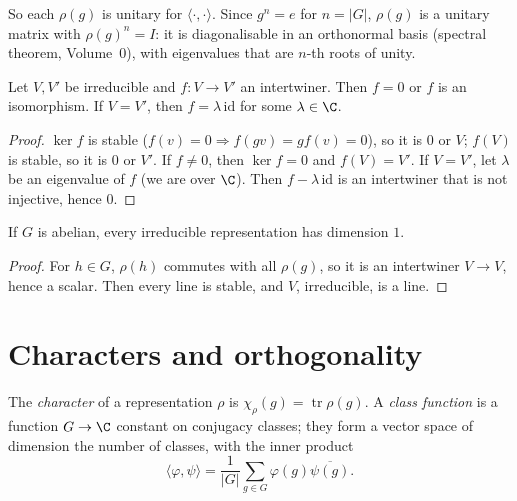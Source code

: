 So each $\rho(g)$ is unitary for $\langle\cdot,\cdot\rangle$. Since $g^n=e$ for $n=|G|$, $\rho(g)$ is a unitary matrix with $\rho(g)^n=I$: it is diagonalisable in an orthonormal basis (spectral theorem, Volume~0), with eigenvalues that are $n$-th roots of unity.

\begin{lemma}[Schur]\label{lem:schur}
Let $V,V'$ be irreducible and $f:V\to V'$ an intertwiner. Then $f=0$ or $f$ is an isomorphism. If $V=V'$, then $f=\lambda\,\mathrm{id}$ for some $\lambda\in\C$.
\end{lemma}
\begin{proof}
$\ker f$ is stable ($f(v)=0\Rightarrow f(gv)=gf(v)=0$), so it is $0$ or $V$; $f(V)$ is stable, so it is $0$ or $V'$. If $f\ne0$, then $\ker f=0$ and $f(V)=V'$. If $V=V'$, let $\lambda$ be an eigenvalue of $f$ (we are over $\C$). Then $f-\lambda\,\mathrm{id}$ is an intertwiner that is not injective, hence $0$.
\end{proof}

\begin{corollary}\label{cor:abelianirr}
If $G$ is abelian, every irreducible representation has dimension $1$.
\end{corollary}
\begin{proof}
For $h\in G$, $\rho(h)$ commutes with all $\rho(g)$, so it is an intertwiner $V\to V$, hence a scalar. Then every line is stable, and $V$, irreducible, is a line.
\end{proof}

\section{Characters and orthogonality}

\begin{definition}
The \emph{character} of a representation $\rho$ is $\chi_\rho(g)=\operatorname{tr}\rho(g)$. A \emph{class function} is a function $G\to\C$ constant on conjugacy classes; they form a vector space of dimension the number of classes, with the inner product
\[
\langle\varphi,\psi\rangle=\frac1{|G|}\sum_{g\in G}\varphi(g)\overline{\psi(g)}.
\]
\end{definition}

